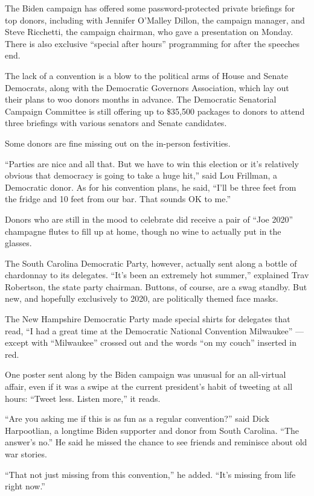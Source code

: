 The Biden campaign has offered some password-protected private briefings
for top donors, including with Jennifer O'Malley Dillon, the campaign
manager, and Steve Ricchetti, the campaign chairman, who gave a
presentation on Monday. There is also exclusive ``special after hours''
programming for after the speeches end.

The lack of a convention is a blow to the political arms of House and
Senate Democrats, along with the Democratic Governors Association, which
lay out their plans to woo donors months in advance. The Democratic
Senatorial Campaign Committee is still offering up to \$35,500 packages
to donors to attend three briefings with various senators and Senate
candidates.

Some donors are fine missing out on the in-person festivities.

``Parties are nice and all that. But we have to win this election or
it's relatively obvious that democracy is going to take a huge hit,''
said Lou Frillman, a Democratic donor. As for his convention plans, he
said, ``I'll be three feet from the fridge and 10 feet from our bar.
That sounds OK to me.''

Donors who are still in the mood to celebrate did receive a pair of
``Joe 2020'' champagne flutes to fill up at home, though no wine to
actually put in the glasses.

The South Carolina Democratic Party, however, actually sent along a
bottle of chardonnay to its delegates. ``It's been an extremely hot
summer,'' explained Trav Robertson, the state party chairman. Buttons,
of course, are a swag standby. But new, and hopefully exclusively to
2020, are politically themed face masks.

The New Hampshire Democratic Party made special shirts for delegates
that read, ``I had a great time at the Democratic National Convention
Milwaukee'' --- except with ``Milwaukee'' crossed out and the words ``on
my couch'' inserted in red.

One poster sent along by the Biden campaign was unusual for an
all-virtual affair, even if it was a swipe at the current president's
habit of tweeting at all hours: ``Tweet less. Listen more,'' it reads.

``Are you asking me if this is as fun as a regular convention?'' said
Dick Harpootlian, a longtime Biden supporter and donor from South
Carolina. ``The answer's no.'' He said he missed the chance to see
friends and reminisce about old war stories.

``That not just missing from this convention,'' he added. ``It's missing
from life right now.''


